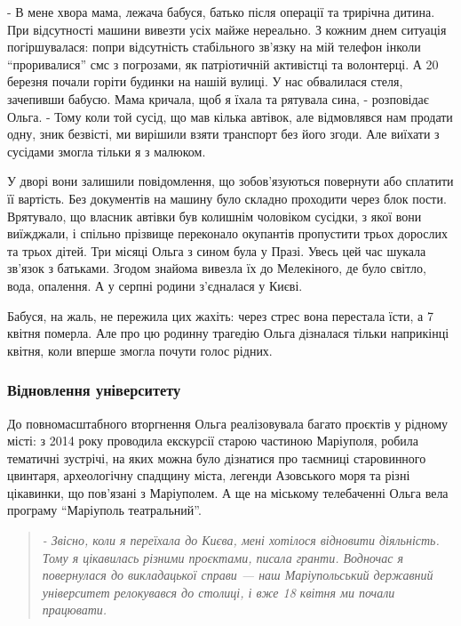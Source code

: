 
- В мене хвора мама, лежача бабуся, батько після операції та трирічна дитина.
При відсутності машини вивезти усіх майже нереально. З кожним днем ситуація
погіршувалася: попри відсутність стабільного зв'язку на мій телефон інколи
\enquote{проривалися} смс з погрозами, як патріотичній активістці та волонтерці. А 20
березня почали горіти будинки на нашій вулиці. У нас обвалилася стеля,
зачепивши бабусю. Мама кричала, щоб я їхала та рятувала сина, - розповідає
Ольга. -  Тому коли той сусід, що мав кілька автівок, але відмовлявся нам
продати одну, зник безвісті, ми вирішили взяти транспорт без його згоди. Але
виїхати з сусідами змогла тільки я з малюком.

У дворі вони залишили повідомлення, що зобов'язуються повернути або сплатити її
вартість. Без документів на машину було складно проходити через блок пости.
Врятувало, що власник автівки був колишнім чоловіком сусідки, з якої вони
виїжджали, і спільно прізвище переконало окупантів пропустити трьох дорослих та
трьох дітей. Три місяці Ольга з сином була у Празі. Увесь цей час шукала
зв'язок з батьками. Згодом знайома вивезла їх до Мелекіного, де було світло,
вода, опалення. А у серпні родини з'єдналася у Києві.

Бабуся, на жаль, не пережила цих жахіть: через стрес вона перестала їсти, а 7
квітня померла. Але про цю родинну трагедію Ольга дізналася тільки наприкінці
квітня, коли вперше змогла почути голос рідних.

\subsubsection{Відновлення університету}

До повномасштабного вторгнення Ольга реалізовувала багато проєктів у рідному
місті: з 2014 року проводила екскурсії старою частиною Маріуполя, робила
тематичні зустрічі, на яких можна було дізнатися про таємниці старовинного
цвинтаря, археологічну спадщину міста, легенди Азовського моря та різні
цікавинки, що пов'язані з Маріуполем. А ще на міському телебаченні Ольга вела
програму \enquote{Маріуполь театральний}. 

\begin{quote}
\em - Звісно, коли я переїхала до Києва, мені хотілося відновити діяльність. Тому я
цікавилась різними проєктами, писала гранти. Водночас я повернулася до
викладацької справи — наш Маріупольський державний університет релокувався до
столиці, і вже 18 квітня ми почали працювати. 
\end{quote}

